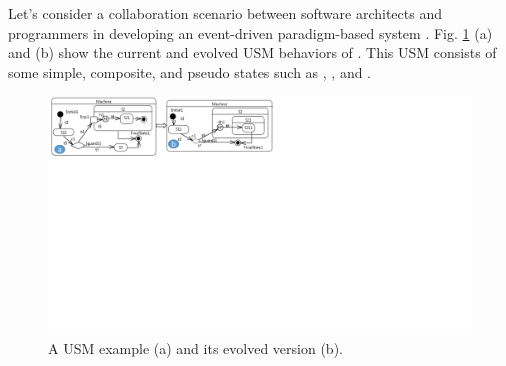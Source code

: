Let's consider a collaboration scenario between software architects and programmers in developing an event-driven paradigm-based system . 
Fig. \ref{fig:illustration} (a) and (b) show the current and evolved USM behaviors of .
This USM consists of some simple, composite, and pseudo states such as , , and .

\begin{figure}
	\centering
	\includegraphics[clip, trim=0.2cm 14cm 15.8cm 0.1cm, width=1.0\columnwidth]{figures/illustration}
	\caption{A USM example (a) and its evolved version (b).} 
	\label{fig:illustration}
\end{figure}



